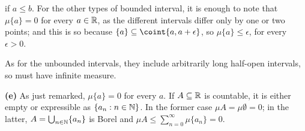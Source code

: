 {\noindent if $a\le b$.   For the other types of bounded
interval, it is enough to note that $\mu\{a\}=0$ for every $a\in\Bbb R$,
as the different intervals differ only by one or two points;  and this
is so because $\{a\}\subseteq\coint{a,a+\epsilon}$, so
$\mu\{a\}\le\epsilon$, for every $\epsilon>0$.

As for the unbounded intervals, they include arbitrarily long half-open
intervals, so must have infinite measure.

\medskip

{\bf (e)} As just remarked, $\mu\{a\}=0$ for every $a$.   If
$A\subseteq\Bbb R$ is countable, it is either empty or expressible as
$\{a_n:n\in\Bbb N\}$.   In the former case $\mu A=\mu\emptyset=0$;  in
the latter, $A=\bigcup_{n\in\Bbb N}\{a_n\}$ is Borel and $\mu
A\le\sum_{n=0}^{\infty}\mu\{a_n\}=0$.
}%

